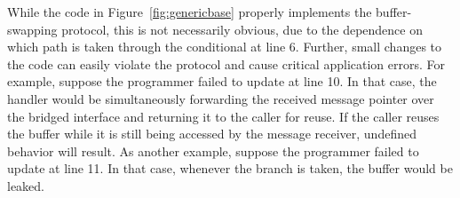 While the code in Figure~\ref{fig:genericbase} properly implements the
buffer-swapping protocol, this is not necessarily obvious, due to the
dependence on which path is taken through the conditional at line 6.  
Further, small changes to the code can easily violate the
protocol and cause critical application errors.  For example, suppose
the programmer failed to update  at line 10.
In that case, the handler would be simultaneously forwarding the
received message pointer over the bridged interface and returning it to the
caller for reuse.  If the caller reuses the buffer while it is still
being accessed by the message receiver, undefined behavior will
result.
As another example, suppose the programmer failed to update
 at line 11.  In that case, whenever the 
branch is taken, the  buffer would be leaked.






